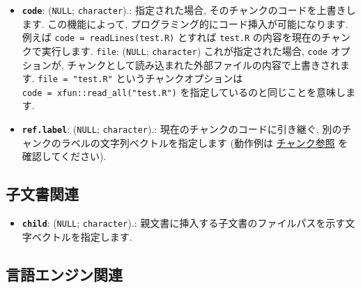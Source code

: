\documentclass[
  lualatex,ja=standard,jafont=noto-otf]{bxjsreport}
\providecommand{\tightlist}{%
  \setlength{\itemsep}{0pt}\setlength{\parskip}{0pt}}
\begin{document}
\begin{itemize}
\tightlist
\item
  \textbf{\texttt{code}}: (\texttt{NULL}; \texttt{character}).:
  指定された場合, そのチャンクのコードを上書きします. この機能によって,
  プログラミング的にコード挿入が可能になります. 例えば
  \texttt{code\ =\ readLines(\textquotesingle{}test.R\textquotesingle{})}
  とすれば \texttt{test.R} の内容を現在のチャンクで実行します.
  \texttt{file}: (\texttt{NULL}; \texttt{character})
  これが指定された場合, \texttt{code} オプションが,
  チャンクとして読み込まれた外部ファイルの内容で上書きされます.
  \texttt{file\ =\ "test.R"} というチャンクオプションは
  \texttt{code\ =\ xfun::read\_all("test.R")}
  を指定しているのと同じことを意味します.
\item
  \textbf{\texttt{ref.label}}: (\texttt{NULL}; \texttt{character}).:
  現在のチャンクのコードに引き継ぐ,
  別のチャンクのラベルの文字列ベクトルを指定します (動作例は
  \protect\hyperlink{reference}{チャンク参照} を確認してください).
\end{itemize}

\hypertarget{child-document}{%
\subsection{子文書関連}\label{child-document}}

\begin{itemize}
\tightlist
\item
  \textbf{\texttt{child}}: (\texttt{NULL}; \texttt{character}).:
  親文書に挿入する子文書のファイルパスを示す文字ベクトルを指定します.
\end{itemize}

\hypertarget{engine}{%
\subsection{言語エンジン関連}\label{engine}}
\end{document}
